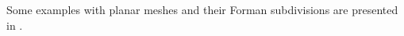 \begin{example}
  Some examples with planar meshes and their Forman subdivisions are presented
  in .
\end{example}
